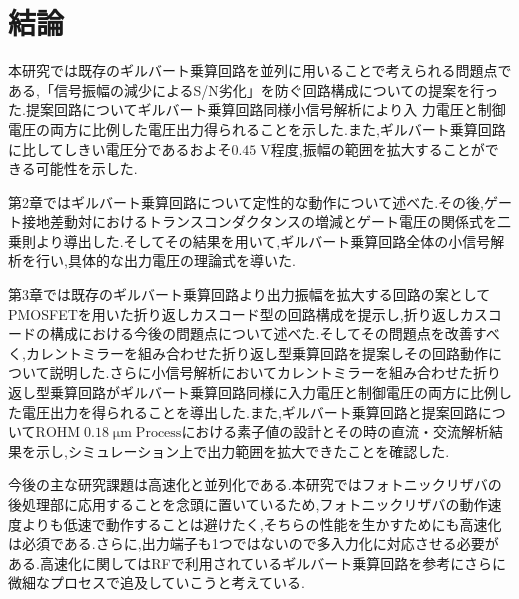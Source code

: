 \chapter{結論}

    本研究では既存のギルバート乗算回路を並列に用いることで考えられる問題点である,「信号振幅の減少によるS/N劣化」を防ぐ回路構成についての提案を行った.提案回路についてギルバート乗算回路同様小信号解析により入
    力電圧と制御電圧の両方に比例した電圧出力得られることを示した.また,ギルバート乗算回路に比してしきい電圧分であるおよそ$0.45\;\mathrm{V}$程度,振幅の範囲を拡大することができる可能性を示した.\par

    第2章ではギルバート乗算回路について定性的な動作について述べた.その後,ゲート接地差動対におけるトランスコンダクタンスの増減とゲート電圧の関係式を二乗則より導出した.そしてその結果を用いて,ギルバート乗算回路全体の小信号解析を行い,具体的な出力電圧の理論式を導いた.\par

    第3章では既存のギルバート乗算回路より出力振幅を拡大する回路の案としてPMOSFETを用いた折り返しカスコード型の回路構成を提示し,折り返しカスコードの構成における今後の問題点について述べた.そしてその問題点を改善すべく,カレントミラーを組み合わせた折り返し型乗算回路を提案しその回路動作について説明した.さらに小信号解析においてカレントミラーを組み合わせた折り返し型乗算回路がギルバート乗算回路同様に入力電圧と制御電圧の両方に比例した電圧出力を得られることを導出した.また,ギルバート乗算回路と提案回路について$\mathrm{ROHM\;0.18\;\mu m\;Process}$における素子値の設計とその時の直流・交流解析結果を示し,シミュレーション上で出力範囲を拡大できたことを確認した.\par

    今後の主な研究課題は高速化と並列化である.本研究ではフォトニックリザバの後処理部に応用することを念頭に置いているため,フォトニックリザバの動作速度よりも低速で動作することは避けたく,そちらの性能を生かすためにも高速化は必須である.さらに,出力端子も1つではないので多入力化に対応させる必要がある.高速化に関してはRFで利用されているギルバート乗算回路を参考にさらに微細なプロセスで追及していこうと考えている.